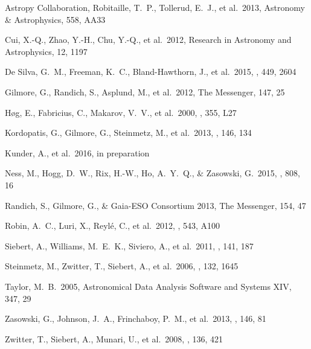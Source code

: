 \documentclass[preprint2,trackchanges]{aastex}
\begin{document}
\begin{thebibliography}{dummy}
 Astropy Collaboration, Robitaille, T.~P., Tollerud, E.~J., et al.\ 2013, Astronomy \& Astrophysics, 558, AA33

 Cui, X.-Q., Zhao, Y.-H., Chu, Y.-Q., et al.\ 2012, Research in Astronomy and Astrophysics, 12, 1197 

 De Silva, G.~M., Freeman, K.~C., Bland-Hawthorn, J., et al.\ 2015, \mnras, 449, 2604 

 Gilmore, G., Randich, S., Asplund, M., et al.\ 2012, The Messenger, 147, 25 

 H{\o}g, E., Fabricius, C., Makarov, V.~V., et al.\ 2000, \aap, 355, L27 

 Kordopatis, G., Gilmore, G., Steinmetz, M., et al.\ 2013, \aj, 146, 134 

 Kunder, A., et al.\ 2016, in preparation

 Ness, M., Hogg, D.~W., Rix, H.-W., Ho, A.~Y.~Q., \& Zasowski, G.\ 2015, \apj, 808, 16 

 Randich, S., Gilmore, G., \& Gaia-ESO Consortium 2013, The Messenger, 154, 47 

 Robin, A.~C., Luri, X., Reyl{\'e}, C., et al.\ 2012, \aap, 543, A100 

 Siebert, A., Williams, M.~E.~K., Siviero, A., et al.\ 2011, \aj, 141, 187 

 Steinmetz, M., Zwitter, T., Siebert, A., et al.\ 2006, \aj, 132, 1645 

 Taylor, M.~B.\ 2005, Astronomical Data Analysis Software and Systems XIV, 347, 29 

 Zasowski, G., Johnson, J.~A., Frinchaboy, P.~M., et al.\ 2013, \aj, 146, 81 

 Zwitter, T., Siebert, A., Munari, U., et al.\ 2008, \aj, 136, 421 

\end{thebibliography}
\end{document}
